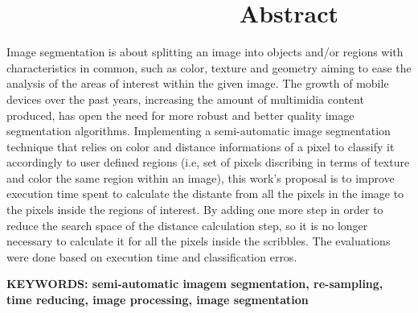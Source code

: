 %
% 

\chapter*{\ \ \ \ \ \ \ \ \ \ \ \ \ \ \ \ \ \ Abstract}\thispagestyle{empty}

%

Image segmentation is about splitting an image into objects and/or regions with characteristics in common, such as color, texture and geometry aiming to ease the analysis of the areas of interest within the given image. The growth of mobile devices over the past years, increasing the amount of multimidia content produced, has open the need for more robust and better quality image segmentation algorithms. Implementing a semi-automatic image segmentation technique that relies on color and distance informations of a pixel to classify it accordingly to user defined regions (i.e, set of pixels discribing in terms of texture and color the same region within an image), this work's proposal is to improve execution time spent to calculate the distante from all the pixels in the image to the pixels inside the regions of interest. By adding one more step in order to reduce the search space of the distance calculation step, so it is no longer necessary to calculate it for all the pixels inside the scribbles. The evaluations were done based on execution time and classification erros.

\textbf{KEYWORDS: semi-automatic imagem segmentation, re-sampling, time reducing, image processing, image segmentation}

%
%
